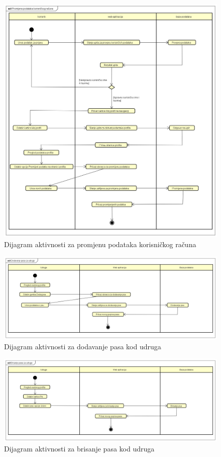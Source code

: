 		\begin{figure}[H]
			\includegraphics[scale=0.4]{dijagrami/Promijena_podataka_korisnickog_racuna.png}
			\centering
			\caption{Dijagram aktivnosti za promjenu podataka korisničkog računa}
			\label{fig:activity_diagram_5}
		\end{figure}


		\begin{figure}[H]
			\includegraphics[scale=0.4]{dijagrami/Dodavanje_pasa_za_udruge.png}
			\centering
			\caption{Dijagram aktivnosti za dodavanje pasa kod udruga}
			\label{fig:activity_diagram_6}
		\end{figure}

		\begin{figure}[H]
			\includegraphics[scale=0.4]{dijagrami/Brisanje_pasa_za_udruge.png}
			\centering
			\caption{Dijagram aktivnosti za brisanje pasa kod udruga}
			\label{fig:activity_diagram_7}
		\end{figure}

